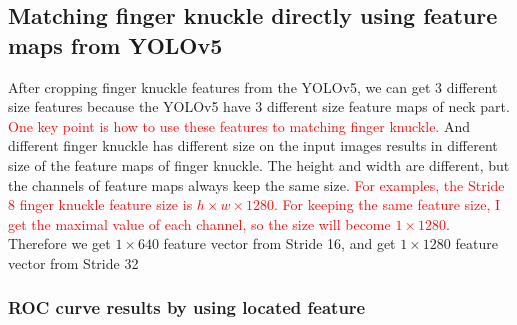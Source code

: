 \subsection{Matching finger knuckle directly using feature maps from YOLOv5}

After cropping finger knuckle features from the YOLOv5, we can get 3 different size features because the YOLOv5 have 3 different size feature maps of neck part. \textcolor{red}{One key point is how to use these features to matching finger knuckle.} And different finger knuckle has different size on the input images results in different size of the feature maps of finger knuckle. The height and width are different, but the channels of feature maps always keep the same size. \textcolor{red}{For examples, the Stride 8 finger knuckle feature size is $h\times w \times 1280$. For keeping the same feature size, I get the maximal value of each channel, so the size will become $1 \times 1280$}. Therefore we get $1 \times 640$ feature vector from Stride 16, and get $1 \times 1280$ feature vector from Stride 32

\subsubsection{ROC curve results by using located feature}

